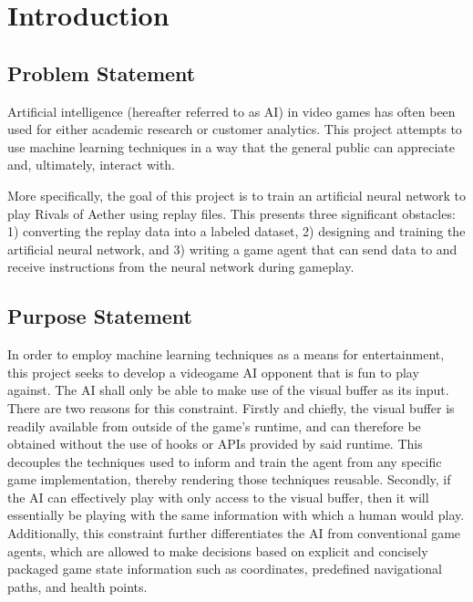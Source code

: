 \chapter{Introduction}


\section{Problem Statement}

Artificial intelligence (hereafter referred to as AI) in video games has often been used for either academic research or customer analytics. This project attempts to use machine learning techniques in a way that the general public can appreciate and, ultimately, interact with.

More specifically, the goal of this project is to train an artificial neural network to play Rivals of Aether using replay files. This presents three significant obstacles: 1) converting the replay data into a labeled dataset, 2) designing and training the artificial neural network, and 3) writing a game agent that can send data to and receive instructions from the neural network during gameplay.




\section{Purpose Statement}

 In order to employ machine learning techniques as a means for entertainment, this project seeks to develop a videogame AI opponent that is fun to play against. The AI shall only be able to make use of the visual buffer as its input. There are two reasons for this constraint. Firstly and chiefly, the visual buffer is readily available from outside of the game's runtime, and can therefore be obtained without the use of hooks or APIs provided by said runtime. This decouples the techniques used to inform and train the agent from any specific game implementation, thereby rendering those techniques reusable. Secondly, if the AI can effectively play with only access to the visual buffer, then it will essentially be playing with the same information with which a human would play. Additionally, this constraint further differentiates the AI from conventional game agents, which are allowed to make decisions based on explicit and concisely packaged game state information such as coordinates, predefined navigational paths, and health points.
 
